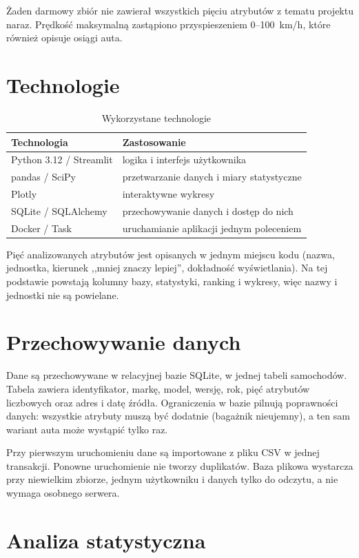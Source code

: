 \documentclass[11pt,a4paper]{article}
\begin{document}
Żaden darmowy zbiór nie zawierał wszystkich pięciu atrybutów z tematu projektu naraz.
Prędkość maksymalną zastąpiono przyspieszeniem 0--100~km/h, które również opisuje osiągi auta.

\section{Technologie}

\begin{table}[H]
\centering
\begin{tabular}{ll}
\toprule
Technologia & Zastosowanie \\
\midrule
Python 3.12 / Streamlit & logika i interfejs użytkownika \\
pandas / SciPy & przetwarzanie danych i miary statystyczne \\
Plotly & interaktywne wykresy \\
SQLite / SQLAlchemy & przechowywanie danych i dostęp do nich \\
Docker / Task & uruchamianie aplikacji jednym poleceniem \\
\bottomrule
\end{tabular}
\caption{Wykorzystane technologie}
\end{table}

Pięć analizowanych atrybutów jest opisanych w jednym miejscu kodu (nazwa, jednostka,
kierunek ,,mniej znaczy lepiej'', dokładność wyświetlania). Na tej podstawie powstają
kolumny bazy, statystyki, ranking i wykresy, więc nazwy i jednostki nie są powielane.

\section{Przechowywanie danych}

Dane są przechowywane w relacyjnej bazie SQLite, w jednej tabeli samochodów. Tabela zawiera
identyfikator, markę, model, wersję, rok, pięć atrybutów liczbowych oraz adres i datę źródła.
Ograniczenia w bazie pilnują poprawności danych: wszystkie atrybuty muszą być dodatnie
(bagażnik nieujemny), a ten sam wariant auta może wystąpić tylko raz.

Przy pierwszym uruchomieniu dane są importowane z pliku CSV w jednej transakcji. Ponowne
uruchomienie nie tworzy duplikatów. Baza plikowa wystarcza przy niewielkim zbiorze, jednym
użytkowniku i danych tylko do odczytu, a nie wymaga osobnego serwera.

\section{Analiza statystyczna}
\end{document}
